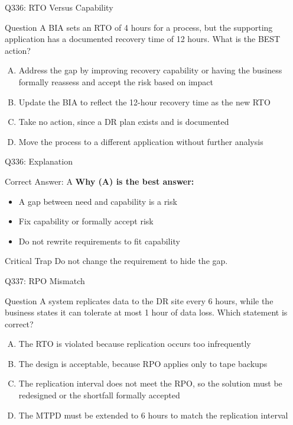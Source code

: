 \documentclass{beamer}
\begin{document}
	\begin{frame}{Q336: RTO Versus Capability}
		\begin{block}{Question}
			\small A BIA sets an RTO of 4 hours for a process, but the supporting application has a documented recovery time of 12 hours. What is the BEST action?
		\end{block}
		\begin{enumerate}[(A)]
			\footnotesize
			\item Address the gap by improving recovery capability or having the business formally reassess and accept the risk based on impact
			\item Update the BIA to reflect the 12-hour recovery time as the new RTO
			\item Take no action, since a DR plan exists and is documented
			\item Move the process to a different application without further analysis
		\end{enumerate}
	\end{frame}
	
	\begin{frame}{Q336: Explanation}
		\begin{block}{Correct Answer: A}
			\textbf{Why (A) is the best answer:}
			\begin{itemize}
				\item A gap between need and capability is a risk
				\item Fix capability or formally accept risk
				\item Do not rewrite requirements to fit capability
			\end{itemize}
		\end{block}
		\begin{alertblock}{Critical Trap}
			Do not change the requirement to hide the gap.
		\end{alertblock}
	\end{frame}
	
	\begin{frame}{Q337: RPO Mismatch}
		\begin{block}{Question}
			\small A system replicates data to the DR site every 6 hours, while the business states it can tolerate at most 1 hour of data loss. Which statement is correct?
		\end{block}
		\begin{enumerate}[(A)]
			\footnotesize
			\item The RTO is violated because replication occurs too infrequently
			\item The design is acceptable, because RPO applies only to tape backups
			\item The replication interval does not meet the RPO, so the solution must be redesigned or the shortfall formally accepted
			\item The MTPD must be extended to 6 hours to match the replication interval
		\end{enumerate}
	\end{frame}
	
\end{document}
